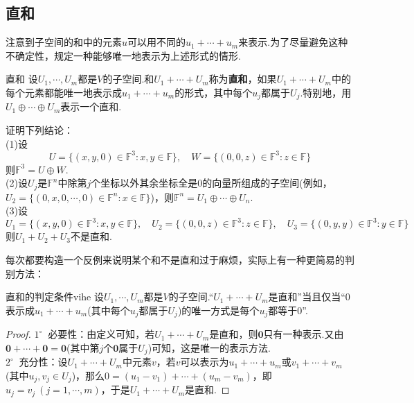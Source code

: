 \documentclass[lang=cn, zihao=5]{elegantbook}
\newcommand{\F}{\mathbb{F}}
\newcommand{\buzhou}[1]{$#1^{\circ} \ $}
\begin{document}
\subsection{直和}

注意到子空间的和中的元素$u$可以用不同的$u_1+ \cdots + u_m$来表示.为了尽量避免这种不确定性，规定一种能够唯一地表示为上述形式的情形.

\begin{definition}{直和}
    设$U_1,\cdots ,U_m$都是$V$的子空间.和$U_1 + \cdots + U_m$称为\textbf{直和}，如果$U_1+ \cdots +U_m$中的每个元素都能唯一地表示成$u_1+ \cdots + u_m$的形式，其中每个$u_j$都属于$U_j$.特别地，用$U_1 \oplus \cdots \oplus U_m$表示一个直和.
\end{definition}

\begin{example}
    证明下列结论： \\
    (1)设$$U = \{ (x,y,0) \in \F ^{3} : x,y \in \F \}, \quad W = \{ (0,0,z) \in \F ^{3} : z \in \F \}$$
    则$\F ^{3} = U \oplus W$. \\
    (2)设$U_j$是$\F ^{n}$中除第$j$个坐标以外其余坐标全是$0$的向量所组成的子空间(例如，$U_2= \{ (0,x,0,\cdots ,0) \in \F ^{n} : x \in \F \}$)，则$\F ^{n} = U_1 \oplus \cdots \oplus U_n$. \\
    (3)设$$U_1 = \{ (x,y,0) \in \F ^{3} : x,y \in \F \}, \quad U_2 = \{ (0,0,z) \in \F ^{3} : z \in \F \}, \quad U_3 = \{ (0,y,y) \in \F ^{3} : y \in \F \}$$
    则$U_1+U_2+U_3$不是直和.
\end{example}

每次都要构造一个反例来说明某个和不是直和过于麻烦，实际上有一种更简易的判别方法：

\begin{proposition}{直和的判定条件}{vihe}
    设$U_1,\cdots ,U_m$都是$V$的子空间.“$U_1 + \cdots + U_m$是直和”当且仅当“$0$表示成$u_1+\cdots +u_m$(其中每个$u_j$都属于$U_j$)的唯一方式是每个$u_j$都等于$0$”.
\end{proposition}
\begin{proof}
    \buzhou{1} 必要性：由定义可知，若$U_1 + \cdots + U_m$是直和，则$\boldsymbol{0}$只有一种表示.又由$\boldsymbol{0} + \cdots + \boldsymbol{0} = \boldsymbol{0}$(其中第$j$个$\boldsymbol{0}$属于$U_j$)可知，这是唯一的表示方法. \\
    \buzhou{2} 充分性：设$U_1 + \cdots + U_m$中元素$v$，若$v$可以表示为$u_1 + \cdots + u_m$或$v_1 + \cdots + v_m$(其中$u_j,v_j \in U_j$)，那么$0 = (u_1 - v_1) + \cdots + (u_m - v_m)$，即$u_j=v_j ~(j=1,\cdots ,m)$，于是$U_1 + \cdots + U_m$是直和.
\end{proof}
\end{document}
